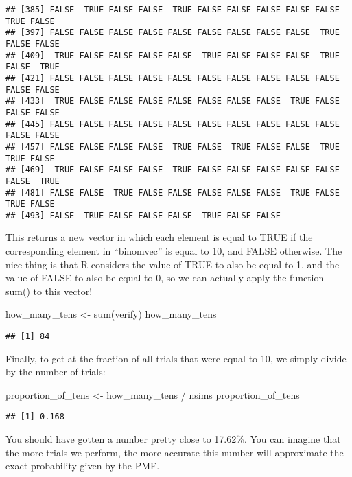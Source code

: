 \documentclass[
]{book}
\newenvironment{Shaded}{\begin{snugshade}}{\end{snugshade}}
\newcommand{\FunctionTok}[1]{\textcolor[rgb]{0.00,0.00,0.00}{#1}}
\newcommand{\NormalTok}[1]{#1}
\newcommand{\OtherTok}[1]{\textcolor[rgb]{0.56,0.35,0.01}{#1}}
\newcommand{\SpecialCharTok}[1]{\textcolor[rgb]{0.00,0.00,0.00}{#1}}
\begin{document}
\begin{verbatim}
## [385] FALSE  TRUE FALSE FALSE  TRUE FALSE FALSE FALSE FALSE FALSE  TRUE FALSE
## [397] FALSE FALSE FALSE FALSE FALSE FALSE FALSE FALSE FALSE  TRUE FALSE FALSE
## [409]  TRUE FALSE FALSE FALSE FALSE  TRUE FALSE FALSE FALSE  TRUE FALSE  TRUE
## [421] FALSE FALSE FALSE FALSE FALSE FALSE FALSE FALSE FALSE FALSE FALSE FALSE
## [433]  TRUE FALSE FALSE FALSE FALSE FALSE FALSE FALSE  TRUE FALSE FALSE FALSE
## [445] FALSE FALSE FALSE FALSE FALSE FALSE FALSE FALSE FALSE FALSE FALSE FALSE
## [457] FALSE FALSE FALSE FALSE  TRUE FALSE  TRUE FALSE FALSE  TRUE  TRUE FALSE
## [469]  TRUE FALSE FALSE FALSE  TRUE FALSE FALSE FALSE FALSE FALSE FALSE  TRUE
## [481] FALSE FALSE  TRUE FALSE FALSE FALSE FALSE FALSE  TRUE FALSE  TRUE FALSE
## [493] FALSE  TRUE FALSE FALSE FALSE  TRUE FALSE FALSE
\end{verbatim}

This returns a new vector in which each element is equal to TRUE if the corresponding element in ``binomvec'' is equal to 10, and FALSE otherwise. The nice thing is that R considers the value of TRUE to also be equal to 1, and the value of FALSE to also be equal to 0, so we can actually apply the function sum() to this vector!

\begin{Shaded}
\begin{Highlighting}[]
\NormalTok{how\_many\_tens }\OtherTok{\textless{}{-}} \FunctionTok{sum}\NormalTok{(verify)}
\NormalTok{how\_many\_tens}
\end{Highlighting}
\end{Shaded}

\begin{verbatim}
## [1] 84
\end{verbatim}

Finally, to get at the fraction of all trials that were equal to 10, we simply divide by the number of trials:

\begin{Shaded}
\begin{Highlighting}[]
\NormalTok{proportion\_of\_tens }\OtherTok{\textless{}{-}}\NormalTok{ how\_many\_tens }\SpecialCharTok{/}\NormalTok{ nsims}
\NormalTok{proportion\_of\_tens}
\end{Highlighting}
\end{Shaded}

\begin{verbatim}
## [1] 0.168
\end{verbatim}

You should have gotten a number pretty close to 17.62\%. You can imagine that the more trials we perform, the more accurate this number will approximate the exact probability given by the PMF.
\end{document}

